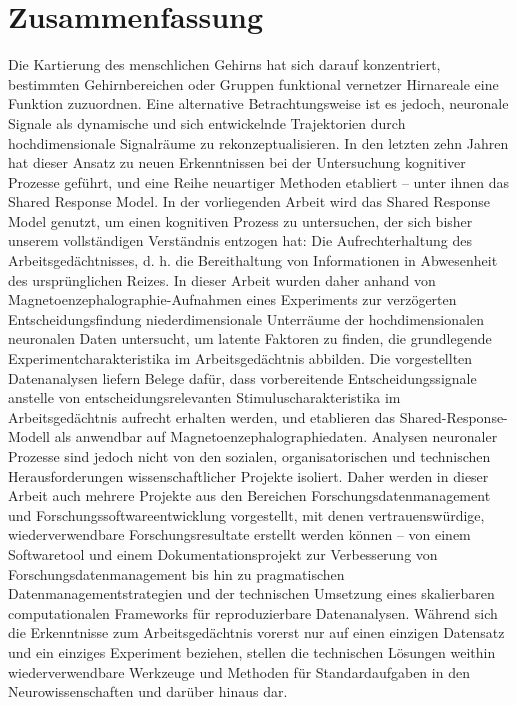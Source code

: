 \documentclass[
  a4paper,  %
  twoside,  %
  bibliography=totoc,
  headsepline,
  cleardoublepage=empty,
  parskip=half,
  draft=false
]{scrbook}
\begin{document}

\pagebreak
\section*{Zusammenfassung}

Die Kartierung des menschlichen Gehirns hat sich darauf konzentriert, bestimmten Gehirnbereichen oder Gruppen funktional vernetzer Hirnareale eine Funktion zuzuordnen.
Eine alternative Betrachtungsweise ist es jedoch, neuronale Signale als dynamische und sich entwickelnde Trajektorien durch  hochdimensionale Signalräume zu rekonzeptualisieren.
In den letzten zehn Jahren hat dieser Ansatz zu neuen Erkenntnissen bei der Untersuchung kognitiver Prozesse geführt, und
eine Reihe neuartiger Methoden etabliert -- unter ihnen das Shared Response Model.
In der vorliegenden Arbeit wird das Shared Response Model genutzt, um einen kognitiven Prozess zu untersuchen, der sich bisher unserem vollständigen Verständnis entzogen hat: Die Aufrechterhaltung des Arbeitsgedächtnisses, d. h. die Bereithaltung von Informationen in Abwesenheit des ursprünglichen Reizes.
In dieser Arbeit wurden daher anhand von Magnetoenzephalographie-Aufnahmen eines Experiments zur verzögerten Entscheidungsfindung  niederdimensionale Unterräume der hochdimensionalen neuronalen Daten untersucht, um latente Faktoren zu finden, die  grundlegende Experimentcharakteristika im Arbeitsgedächtnis abbilden.
Die vorgestellten Datenanalysen liefern Belege dafür, dass vorbereitende Entscheidungssignale anstelle von entscheidungsrelevanten Stimuluscharakteristika im Arbeitsgedächtnis aufrecht erhalten werden, und etablieren das Shared-Response-Modell als anwendbar auf Magnetoenzephalographiedaten.
Analysen neuronaler Prozesse sind jedoch nicht von den sozialen, organisatorischen und technischen Herausforderungen wissenschaftlicher Projekte isoliert.
Daher werden in dieser Arbeit auch mehrere Projekte aus den \mbox{Bereichen} Forschungsdatenmanagement und Forschungssoftwareentwicklung vorgestellt, mit denen vertrauenswürdige, wiederverwendbare Forschungsresultate erstellt werden können -- von einem Softwaretool und einem Dokumentationsprojekt zur Verbesserung von Forschungsdatenmanagement bis hin zu pragmatischen Datenmanagementstrategien und der technischen Umsetzung eines skalierbaren computationalen Frameworks für  reproduzierbare Datenanalysen.
Während sich die Erkenntnisse zum Arbeitsgedächtnis vorerst nur auf einen einzigen Datensatz und ein einziges Experiment beziehen, stellen die technischen Lösungen weithin wiederverwendbare Werkzeuge und Methoden für Standardaufgaben in den Neurowissenschaften und darüber hinaus dar.
\end{document}
